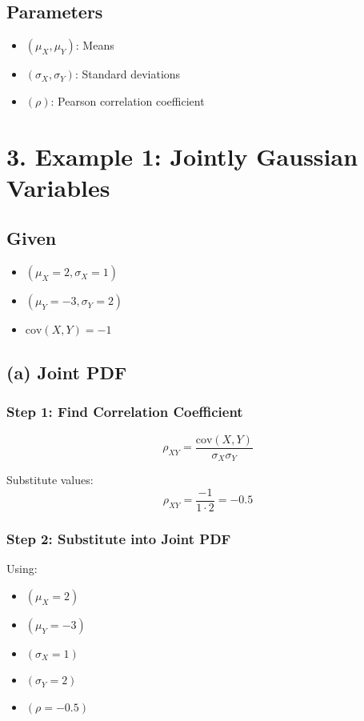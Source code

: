 \documentclass[12pt]{article}
\begin{document}
\subsection*{Parameters}

\begin{itemize}
    \item $(\mu_X, \mu_Y)$: Means
    \item $(\sigma_X, \sigma_Y)$: Standard deviations
    \item $(\rho)$: Pearson correlation coefficient
\end{itemize}

\section*{3. Example 1: Jointly Gaussian Variables}

\subsection*{Given}

\begin{itemize}
    \item $(\mu_X = 2, \sigma_X = 1)$
    \item $(\mu_Y = -3, \sigma_Y = 2)$
    \item $\text{cov}(X,Y) = -1$
\end{itemize}

\subsection*{(a) Joint PDF}

\subsubsection*{Step 1: Find Correlation Coefficient}

\[
\rho_{XY} = \frac{\text{cov}(X,Y)}{\sigma_X \sigma_Y}
\]

Substitute values:
\[
\rho_{XY} = \frac{-1}{1 \cdot 2} = -0.5
\]

\subsubsection*{Step 2: Substitute into Joint PDF}

Using:

\begin{itemize}
    \item $(\mu_X = 2)$
    \item $(\mu_Y = -3)$
    \item $(\sigma_X = 1)$
    \item $(\sigma_Y = 2)$
    \item $(\rho = -0.5)$
\end{itemize}
\end{document}
